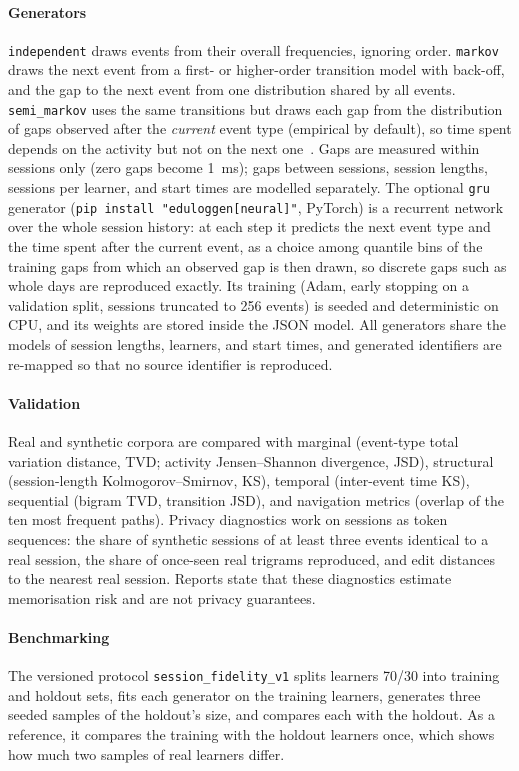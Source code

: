\documentclass[preprint,12pt]{elsarticle}
\begin{document}
\paragraph{Generators} \texttt{independent} draws events from their overall
frequencies, ignoring order. \texttt{markov} draws the next event from a
first- or higher-order transition model with back-off, and the gap to the
next event from one distribution shared by all events. \texttt{semi\_markov}
uses the same transitions but draws each gap from the distribution of gaps
observed after the \emph{current} event type (empirical by default), so time
spent depends on the activity but not on the next one~\cite{yu2010hsmm}.
Gaps are measured within sessions only (zero gaps become 1~ms); gaps between
sessions, session lengths, sessions per learner, and start times are modelled
separately. The optional \texttt{gru} generator (\texttt{pip install
"eduloggen[neural]"}, PyTorch) is a recurrent network over the whole session
history: at each step it predicts the next event type and the time spent
after the current event, as a choice among quantile bins of the training
gaps from which an observed gap is then drawn, so discrete gaps such as whole
days are reproduced exactly. Its training (Adam, early stopping on a
validation split, sessions truncated to 256 events) is seeded and
deterministic on CPU, and its weights are stored inside the JSON model. All
generators share the models of session lengths, learners, and start times,
and generated identifiers are re-mapped so that no source identifier is
reproduced.

\paragraph{Validation} Real and synthetic corpora are compared with marginal
(event-type total variation distance, TVD; activity Jensen--Shannon
divergence, JSD), structural (session-length Kolmogorov--Smirnov, KS),
temporal (inter-event time KS), sequential (bigram TVD, transition JSD), and
navigation metrics (overlap of the ten most frequent paths). Privacy
diagnostics work on sessions as token sequences: the share of synthetic
sessions of at least three events identical to a real session, the share of
once-seen real trigrams reproduced, and edit distances to the nearest real
session. Reports state that these diagnostics estimate memorisation risk and
are not privacy guarantees.

\paragraph{Benchmarking} The versioned protocol \texttt{session\_fidelity\_v1}
splits learners 70/30 into training and holdout sets, fits each generator on
the training learners, generates three seeded samples of the holdout's size,
and compares each with the holdout. As a reference, it compares the
training with the holdout learners once, which shows how much two samples of
real learners differ.
\end{document}
